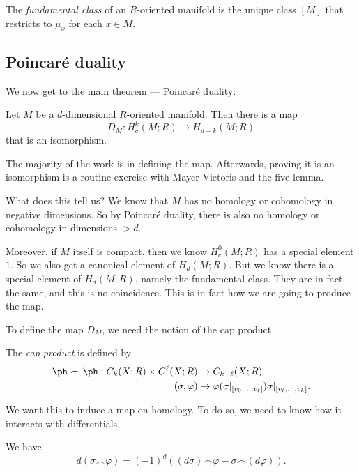 \documentclass[a4paper]{article}
\theoremstyle{definition}
\begin{document}
\begin{defi}
  The \emph{fundamental class} of an $R$-oriented manifold is the unique class $[M]$ that restricts to $\mu_x$ for each $x \in M$.
\end{defi}

\subsection{\texorpdfstring{Poincar\'e}{Poincare} duality}
We now get to the main theorem --- Poincar\'e duality:
\begin{thm}
  Let $M$ be a $d$-dimensional $R$-oriented manifold. Then there is a map
  \[
    D_M: H^k_c(M; R) \to H_{d - k}(M; R)
  \]
  that is an isomorphism.
\end{thm}
The majority of the work is in defining the map. Afterwards, proving it is an isomorphism is a routine exercise with Mayer-Vietoris and the five lemma.

What does this tell us? We know that $M$ has no homology or cohomology in negative dimensions. So by Poincar\'e duality, there is also no homology or cohomology in dimensions $> d$.

Moreover, if $M$ itself is compact, then we know $H^0_c(M; R)$ has a special element $1$. So we also get a canonical element of $H_d(M; R)$. But we know there is a special element of $H_d(M; R)$, namely the fundamental class. They are in fact the same, and this is no coincidence. This is in fact how we are going to produce the map.

To define the map $D_M$, we need the notion of the cap product
\begin{defi}
  The \emph{cap product} is defined by
  \begin{align*}
    \ph \frown \ph : C_k(X; R) \times C^\ell(X; R) &\to C_{k - \ell} (X; R)\\
    (\sigma, \varphi) &\mapsto \varphi(\sigma|_{[v_0, \ldots, v_\ell]}) \sigma|_{[v_{\ell}, \ldots, v_k]}.
  \end{align*}
\end{defi}
We want this to induce a map on homology. To do so, we need to know how it interacts with differentials.
\begin{lemma}
  We have
  \[
    d(\sigma \frown \varphi) = (-1)^d ((d \sigma) \frown \varphi - \sigma \frown (d \varphi)).
  \]
\end{lemma}
\end{document}
